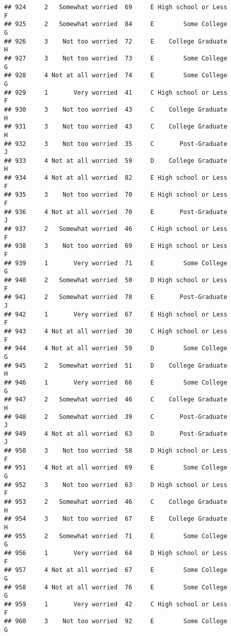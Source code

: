 \documentclass[
]{article}
\begin{document}
\begin{verbatim}
## 924     2   Somewhat worried  69     E High school or Less         F
## 925     2   Somewhat worried  84     E        Some College         G
## 926     3    Not too worried  72     E    College Graduate         H
## 927     3    Not too worried  73     E        Some College         G
## 928     4 Not at all worried  74     E        Some College         G
## 929     1       Very worried  41     C High school or Less         F
## 930     3    Not too worried  43     C    College Graduate         H
## 931     3    Not too worried  43     C    College Graduate         H
## 932     3    Not too worried  35     C       Post-Graduate         J
## 933     4 Not at all worried  59     D    College Graduate         H
## 934     4 Not at all worried  82     E High school or Less         F
## 935     3    Not too worried  70     E High school or Less         F
## 936     4 Not at all worried  70     E       Post-Graduate         J
## 937     2   Somewhat worried  46     C High school or Less         F
## 938     3    Not too worried  69     E High school or Less         F
## 939     1       Very worried  71     E        Some College         G
## 940     2   Somewhat worried  50     D High school or Less         F
## 941     2   Somewhat worried  78     E       Post-Graduate         J
## 942     1       Very worried  67     E High school or Less         F
## 943     4 Not at all worried  30     C High school or Less         F
## 944     4 Not at all worried  59     D        Some College         G
## 945     2   Somewhat worried  51     D    College Graduate         H
## 946     1       Very worried  66     E        Some College         G
## 947     2   Somewhat worried  46     C    College Graduate         H
## 948     2   Somewhat worried  39     C       Post-Graduate         J
## 949     4 Not at all worried  63     D       Post-Graduate         J
## 950     3    Not too worried  58     D High school or Less         F
## 951     4 Not at all worried  69     E        Some College         G
## 952     3    Not too worried  63     D High school or Less         F
## 953     2   Somewhat worried  46     C    College Graduate         H
## 954     3    Not too worried  67     E    College Graduate         H
## 955     2   Somewhat worried  71     E        Some College         G
## 956     1       Very worried  64     D High school or Less         F
## 957     4 Not at all worried  67     E        Some College         G
## 958     4 Not at all worried  76     E        Some College         G
## 959     1       Very worried  42     C High school or Less         F
## 960     3    Not too worried  92     E        Some College         G

\end{verbatim}
\end{document}
